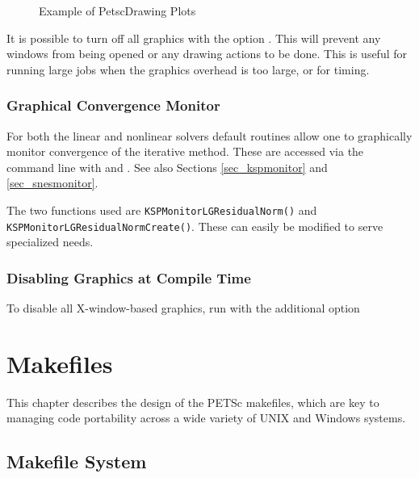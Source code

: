 {{\begin{figure}[H]

\caption{Example of PetscDrawing Plots}
\label{fig_plot}
\end{figure}

It is possible to turn off all graphics with the option 
. This
will prevent any windows from being opened or any drawing actions to be done.
This is useful for running large jobs when the graphics overhead is too
large, or for timing.

\subsection{Graphical Convergence Monitor}
For both the linear and nonlinear solvers default routines
allow one to graphically monitor convergence of the iterative method.
These are accessed via the command line with
 and . 
 See also Sections \ref{sec_kspmonitor} and
\ref{sec_snesmonitor}.

The two functions used are \lstinline{KSPMonitorLGResidualNorm()}
and \break\lstinline{KSPMonitorLGResidualNormCreate()}. These
can easily be modified to serve specialized needs.


\subsection{Disabling Graphics at Compile Time}

To disable all X-window-based graphics, run  with the
additional option 

\cleardoublepage
\chapter{Makefiles}
\label{ch_makefiles}

This chapter describes the design of the PETSc makefiles, which are
key to managing code portability across a wide variety of UNIX and Windows systems.

\section{Makefile System}

}}

